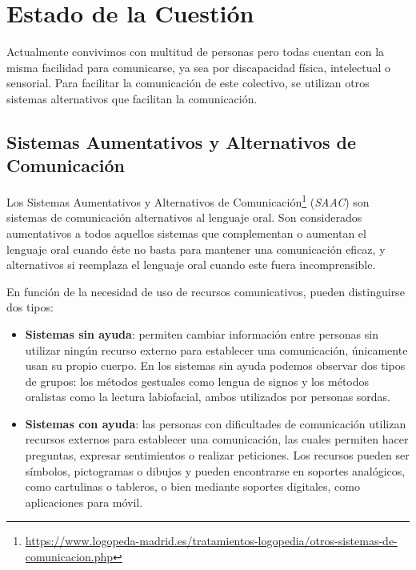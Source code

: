 \chapter{Estado de la Cuestión}
\label{cap:estadoDeLaCuestion}





Actualmente convivimos con multitud de personas pero todas cuentan con la misma facilidad para comunicarse, ya sea por discapacidad física, intelectual o sensorial. Para facilitar la comunicación de este colectivo, se utilizan otros sistemas alternativos que facilitan la comunicación.

\section{Sistemas Aumentativos y Alternativos de Comunicación}
\label{cap3:sec:saac}
Los Sistemas Aumentativos y Alternativos de Comunicación\footnote{\url{https://www.logopeda-madrid.es/tratamientos-logopedia/otros-sistemas-de-comunicacion.php}} (\textit{SAAC}) son sistemas de comunicación alternativos al lenguaje oral. Son considerados aumentativos a todos aquellos sistemas que complementan o aumentan el lenguaje oral cuando éste no basta para mantener una comunicación eficaz, y alternativos si reemplaza el lenguaje oral cuando este fuera incomprensible. 

En función de la necesidad de uso de recursos comunicativos, pueden distinguirse dos tipos:

\begin{itemize}
	\item \textbf{Sistemas sin ayuda}: permiten cambiar información entre personas sin utilizar ningún recurso externo para establecer una comunicación, únicamente usan su propio cuerpo. En los sistemas sin ayuda podemos observar dos tipos de grupos: los métodos gestuales como lengua de signos y los métodos oralistas como la lectura labiofacial, ambos utilizados por personas sordas.
	
	\item \textbf{Sistemas con ayuda}: las personas con dificultades de comunicación utilizan recursos externos para establecer una comunicación, las cuales permiten hacer preguntas, expresar sentimientos o realizar peticiones. Los recursos pueden ser símbolos, pictogramas o dibujos y pueden encontrarse en soportes analógicos, como cartulinas o tableros, o bien mediante soportes digitales, como aplicaciones para móvil.
\end{itemize}

